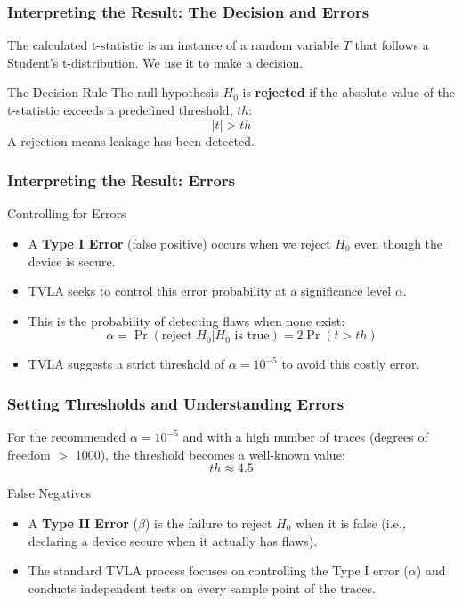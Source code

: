 \begin{frame}
    \frametitle{Interpreting the Result: The Decision and Errors}

    The calculated t-statistic is an instance of a random variable $T$ that follows a Student's t-distribution. We use it to make a decision.

    \begin{alertblock}{The Decision Rule}
        The null hypothesis $H_0$ is \textbf{rejected} if the absolute value of the t-statistic exceeds a predefined threshold, $th$:
        \[ |t| > th \]
        A rejection means leakage has been detected.
    \end{alertblock}
\end{frame}

\begin{frame}
    \frametitle{Interpreting the Result: Errors}
    \begin{block}{Controlling for Errors}
        \begin{itemize}
            \item A \textbf{Type I Error} (false positive) occurs when we reject $H_0$ even though the device is secure.
            \item TVLA seeks to control this error probability at a significance level $\alpha$.
            \item This is the probability of detecting flaws when none exist:
            \[ \alpha = \Pr(\text{reject } H_0 | H_0 \text{ is true}) = 2\Pr(t > th) \]
            \item TVLA suggests a strict threshold of $\alpha = 10^{-5}$ to avoid this costly error.
        \end{itemize}
    \end{block}
\end{frame}

\begin{frame}
    \frametitle{Setting Thresholds and Understanding Errors}


    
    For the recommended $\alpha = 10^{-5}$ and with a high number of traces (degrees of freedom $>$ 1000), the threshold becomes a well-known value:
        \[ th \approx 4.5 \]


    \begin{block}{False Negatives}
        \begin{itemize}
            \item A \textbf{Type II Error} ($\beta$) is the failure to reject $H_0$ when it is false (i.e., declaring a device secure when it actually has flaws).
            \item The standard TVLA process focuses on controlling the Type I error ($\alpha$) and conducts independent tests on every sample point of the traces.
        \end{itemize}
    \end{block}
\end{frame}

